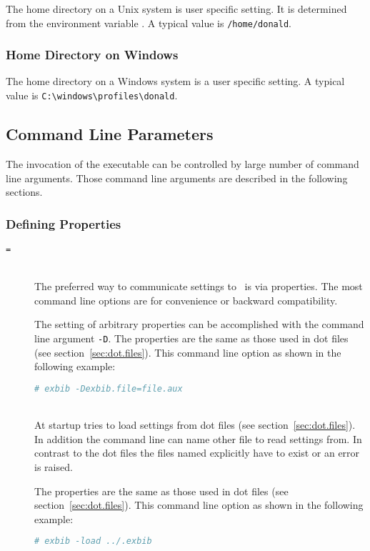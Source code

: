 The home directory on a Unix system is user specific
setting. It is determined from the environment variable . A
typical value is \texttt{/home/donald}.

\subsubsection{Home Directory on Windows}%

The home directory on a Windows system is a user
specific setting.  A typical value is
\verb|C:\windows\profiles\donald|.
%
%

\subsection{Command Line Parameters}

The invocation of the executable  can be controlled by
large number of command line arguments. Those command line arguments
are described in the following sections.

\subsubsection{Defining Properties}

\begin{description}
\item[\texttt{=}]\ \\
  
  The preferred way to communicate settings to \ExBib\ is via
  properties. The most command line options are for convenience or
  backward compatibility.
  
  The setting of arbitrary properties can be accomplished with the
  command line argument \texttt{-D}. The properties are the same as
  those used in dot files (see
  section~\ref{sec:dot.files}). This command line option as shown in
  the following example:

\begin{lstlisting}[language=sh]
# exbib -Dexbib.file=file.aux
\end{lstlisting}

\item[ ]\ \\
  
  At startup  tries to load settings from dot
  files (see section~\ref{sec:dot.files}). In addition
  the command line can name other file to read settings from. In
  contrast to the dot files the files named explicitly have to exist
  or an error is raised.
  
  The properties are the same as those used in dot files (see section~\ref{sec:dot.files}). This command line option
  as shown in the following example:

\begin{lstlisting}[language=sh]
# exbib -load ../.exbib
\end{lstlisting}

\end{description}


